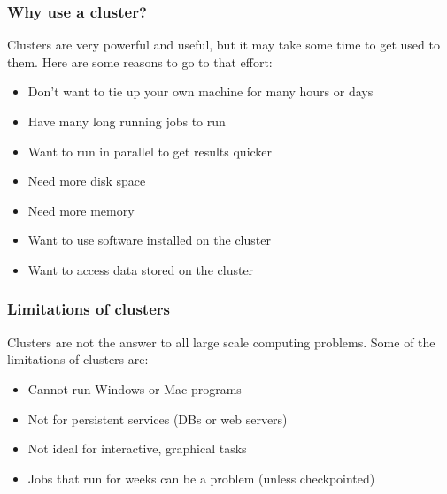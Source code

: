 \documentclass[10pt]{beamer}
\begin{document}
\begin{frame}
\frametitle{Why use a cluster?}
Clusters are very powerful and useful, but it may take some
time to get used to them.
Here are some reasons to go to that effort:

\begin{itemize}
\item Don't want to tie up your own machine for many hours or days
\item Have many long running jobs to run
\item Want to run in parallel to get results quicker
\item Need more disk space
\item Need more memory
\item Want to use software installed on the cluster
\item Want to access data stored on the cluster
\end{itemize}
\end{frame}

\begin{frame}
\frametitle{Limitations of clusters}
Clusters are not the answer to all large scale computing problems.
Some of the limitations of clusters are:

\begin{itemize}
\item Cannot run Windows or Mac programs
\item Not for persistent services (DBs or web servers)
\item Not ideal for interactive, graphical tasks
\item Jobs that run for weeks can be a problem (unless checkpointed)
\end{itemize}
\end{frame}
\end{document}
